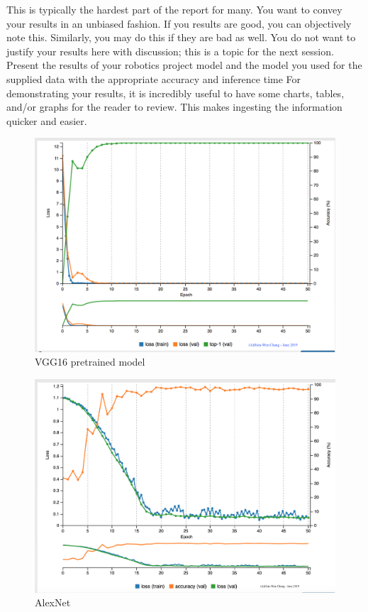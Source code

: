 \documentclass[10pt,journal,compsoc]{IEEEtran}
\begin{document}
This is typically the hardest part of the report for many. You want to convey your results in an unbiased fashion. If you results are good, you can objectively note this. Similarly, you may do this if they are bad as well. You do not want to justify your results here with discussion; this is a topic for the next session. 
Present the results of your robotics project model and the model you used for the supplied data with the appropriate accuracy and inference time
For demonstrating your results, it is incredibly useful to have some charts, tables, and/or graphs for the reader to review. This makes ingesting the information quicker and easier.
\begin{figure}[thpb]
      \centering
      \includegraphics[width=\linewidth]{VGG16AcurracyLoss.png}
      \caption{VGG16 pretrained model}
      \label{fig:robot1}
\end{figure}
\begin{figure}[thpb]
      \centering
      \includegraphics[width=\linewidth]{AlexNet.png}
      \caption{AlexNet}
      \label{fig:robot1}
\end{figure}
\end{document}
